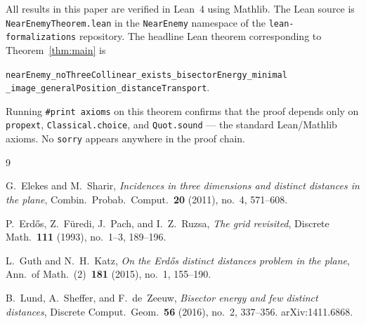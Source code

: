 \documentclass[12pt]{article}
\begin{document}
All results in this paper are verified in Lean~4 using Mathlib.
The Lean source is
\texttt{NearEnemyTheorem.lean} in the \texttt{NearEnemy} namespace
of the \texttt{lean-formalizations} repository.
The headline Lean theorem corresponding to Theorem~\ref{thm:main} is
\begin{center}
\texttt{nearEnemy\_noThreeCollinear\_exists\_bisectorEnergy\_minimal}\\
\texttt{\_image\_generalPosition\_distanceTransport}.
\end{center}
Running \texttt{\#print axioms} on this theorem confirms that the proof
depends only on \texttt{propext}, \texttt{Classical.choice}, and
\texttt{Quot.sound} --- the standard Lean/Mathlib axioms.
No \texttt{sorry} appears anywhere in the proof chain.

\begin{thebibliography}{9}

G.~Elekes and M.~Sharir,
\emph{Incidences in three dimensions and distinct distances in the plane},
Combin.\ Probab.\ Comput.\ \textbf{20} (2011), no.\ 4, 571--608.

P.~Erd\H{o}s, Z.~F\"{u}redi, J.~Pach, and I.~Z.~Ruzsa,
\emph{The grid revisited},
Discrete Math.\ \textbf{111} (1993), no.\ 1--3, 189--196.

L.~Guth and N.~H.~Katz,
\emph{On the Erd\H{o}s distinct distances problem in the plane},
Ann.\ of Math.\ (2)\ \textbf{181} (2015), no.\ 1, 155--190.

B.~Lund, A.~Sheffer, and F.~de~Zeeuw,
\emph{Bisector energy and few distinct distances},
Discrete Comput.\ Geom.\ \textbf{56} (2016), no.\ 2, 337--356.
arXiv:1411.6868.

\end{thebibliography}
\end{document}
